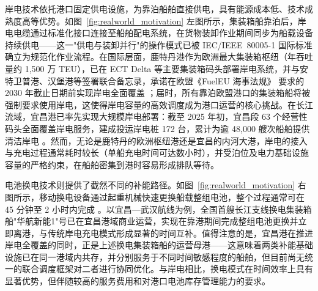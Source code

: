 \documentclass[UTF8, a4paper, 12pt]{ctexart}
\begin{document}
岸电技术依托港口固定供电设施，为靠泊船舶直接供电，具有能源成本低、技术成熟度高等优势。如图~\ref{fig:realworld_motivation} 左图所示，集装箱船靠泊后，岸电电缆通过标准化接口连接至船舶配电系统，在货物装卸作业期间同步为船载设备持续供电——这一"供电与装卸并行"的操作模式已被 IEC/IEEE~80005-1 国际标准 \cite{IEC80005} 确立为规范化作业流程。在国际层面，鹿特丹港作为欧洲最大集装箱枢纽（年吞吐量约 1,500 万 TEU），已在 ECT Delta 等主要集装箱码头部署岸电系统，并与安特卫普港、汉堡港等签署联合备忘录，承诺在欧盟《FuelEU 海事法规》\cite{EU2025} 要求的 2030 年截止日期前实现岸电全面覆盖 \cite{Winkel2016}；届时，所有靠泊欧盟港口的集装箱船将被强制要求使用岸电，这使得岸电容量的高效调度成为港口运营的核心挑战。在长江流域，宜昌港已率先实现大规模岸电部署：截至 2025 年初，宜昌段 63 个经营性码头全面覆盖岸电服务，建成投运岸电桩 172 台，累计为逾 48{,}000 艘次船舶提供清洁岸电 \cite{ICCT2023}。然而，无论是鹿特丹的欧洲枢纽港还是宜昌的内河大港，岸电的接入与充电过程通常耗时较长（单船充电时间可达数小时），并受泊位及电力基础设施容量的严格约束，在船舶密集到港时容易形成排队等待。
 
电池换电技术则提供了截然不同的补能路径。如图~\ref{fig:realworld_motivation} 右图所示，移动换电设备通过起重机械快速更换船载整组电池，整个过程通常可在 45 分钟至 2 小时内完成 \cite{Zhang2022_EShip}。以宜昌—武汉航线为例，全国首艘长江支线换电集装箱船"华航新能1"号已在宜昌港域商业运营，实现在靠港期间完成整组电池更换并立即离港，与传统岸电充电模式形成显著的时间互补。值得注意的是，宜昌港在推进岸电全覆盖的同时，正是上述换电集装箱船的运营母港——这意味着两类补能基础设施已在同一港域内共存，并分别服务于不同时间敏感程度的船舶，但目前尚无统一的联合调度框架对二者进行协同优化。与岸电相比，换电模式在时间效率上具有显著优势，但伴随较高的服务费用和对港口电池库存管理能力的要求。
 
\end{document}
